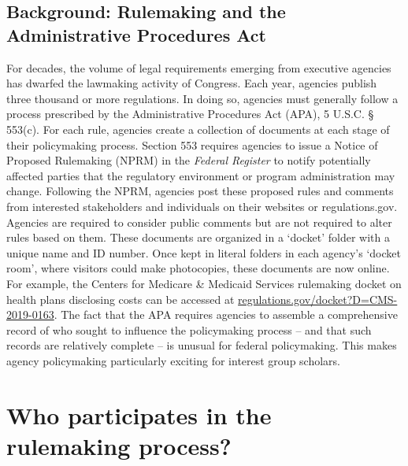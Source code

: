 \documentclass[
      12pt,
        ]{article}
\begin{document}
\hypertarget{background-rulemaking-and-the-administrative-procedures-act}{%
\subsection{Background: Rulemaking and the Administrative Procedures
Act}\label{background-rulemaking-and-the-administrative-procedures-act}}

For decades, the volume of legal requirements emerging from executive
agencies has dwarfed the lawmaking activity of Congress. Each year,
agencies publish three thousand or more regulations. In doing so,
agencies must generally follow a process prescribed by the
Administrative Procedures Act (APA), 5 U.S.C. § 553(c). For each rule,
agencies create a collection of documents at each stage of their
policymaking process. Section 553 requires agencies to issue a Notice of
Proposed Rulemaking (NPRM) in the \emph{Federal Register} to notify
potentially affected parties that the regulatory environment or program
administration may change. Following the NPRM, agencies post these
proposed rules and comments from interested stakeholders and individuals
on their websites or regulations.gov. Agencies are required to consider
public comments but are not required to alter rules based on them. These
documents are organized in a `docket' folder with a unique name and ID
number. Once kept in literal folders in each agency's `docket room',
where visitors could make photocopies, these documents are now online.
For example, the Centers for Medicare \& Medicaid Services rulemaking
docket on health plans disclosing costs can be accessed at
\url{regulations.gov/docket?D=CMS-2019-0163}. The fact that the APA
requires agencies to assemble a comprehensive record of who sought to
influence the policymaking process -- and that such records are
relatively complete -- is unusual for federal policymaking. This makes
agency policymaking particularly exciting for interest group scholars.

\hypertarget{who-participates-in-the-rulemaking-process}{%
\section{Who participates in the rulemaking
process?}\label{who-participates-in-the-rulemaking-process}}
\end{document}
